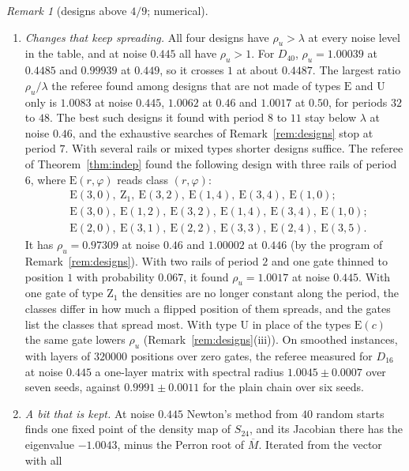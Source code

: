 \documentclass[11pt]{amsart}
\theoremstyle{definition}
\theoremstyle{remark}
\newtheorem{remark}[theorem]{Remark}
\begin{document}
\begin{remark}[designs above $4/9$; numerical]
\begin{enumerate}[label=(\roman*),leftmargin=2.4em]
\item \emph{Changes that keep spreading.} All four designs have $\rho_u>\lambda$ at every noise
level in the table, and at noise $0.445$ all have $\rho_u>1$. For $D_{40}$, $\rho_u=1.00039$ at
$0.4485$ and $0.99939$ at $0.449$, so it crosses $1$ at about $0.4487$. The largest ratio
$\rho_u/\lambda$ the referee found among designs that are not made of types $\mathrm E$ and
$\mathrm U$ only is $1.0083$ at noise $0.445$, $1.0062$ at $0.46$ and $1.0017$ at $0.50$, for
periods $32$ to $48$. The best such designs it found with period $8$ to $11$ stay below
$\lambda$ at noise $0.46$, and the exhaustive searches of Remark~\ref{rem:designs} stop at period
$7$. With several rails or mixed types shorter designs suffice. The referee of
Theorem~\ref{thm:indep} found the following design with three rails of period $6$, where
$\mathrm E(r,\varphi)$ reads class $(r,\varphi)$:
\begin{align*}
&\mathrm E(3,0),\ \mathrm Z_1,\ \mathrm E(3,2),\ \mathrm E(1,4),\ \mathrm E(3,4),\ \mathrm E(1,0);\\
&\mathrm E(3,0),\ \mathrm E(1,2),\ \mathrm E(3,2),\ \mathrm E(1,4),\ \mathrm E(3,4),\ \mathrm E(1,0);\\
&\mathrm E(2,0),\ \mathrm E(3,1),\ \mathrm E(2,2),\ \mathrm E(3,3),\ \mathrm E(2,4),\ \mathrm E(3,5).
\end{align*}
It has $\rho_u=0.97309$ at noise $0.46$ and $1.00002$ at $0.446$ (by the program of
Remark~\ref{rem:designs}). With two rails of period $2$ and one gate
thinned to position $1$ with probability $0.067$, it found $\rho_u=1.0017$ at noise $0.445$.
With one gate of type $\mathrm Z_1$ the densities are no longer constant along the period, the
classes differ in how much a flipped position of them spreads, and the gates list the classes
that spread most. With type $\mathrm U$ in place of the types $\mathrm E(c)$ the same gate lowers
$\rho_u$ (Remark~\ref{rem:designs}(iii)). On smoothed instances, with layers of $320000$
positions over zero gates, the referee measured for $D_{16}$ at noise $0.445$ a one-layer matrix
with spectral radius $1.0045\pm0.0007$ over seven seeds, against $0.9991\pm0.0011$ for the plain
chain over six seeds.
\item \emph{A bit that is kept.} At noise $0.445$ Newton's method from $40$ random starts finds
one fixed point of the density map of $S_{24}$, and its Jacobian there has the eigenvalue
$-1.0043$, minus the Perron root of $\overline M$. Iterated from the vector with all

\end{enumerate}
\end{remark}
\end{document}
